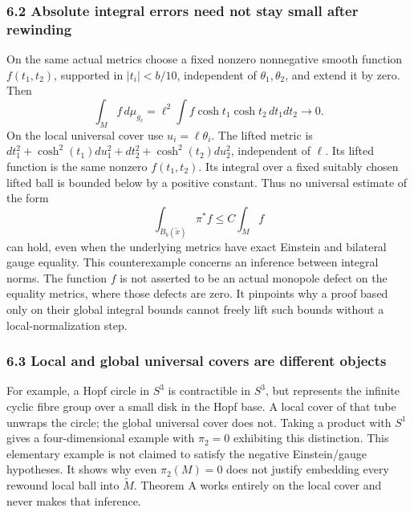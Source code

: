 \documentclass[
  11pt,
]{article}
\begin{document}
\hypertarget{absolute-integral-errors-need-not-stay-small-after-rewinding}{%
\subsubsection{6.2 Absolute integral errors need not stay small after
rewinding}\label{absolute-integral-errors-need-not-stay-small-after-rewinding}}

On the same actual metrics choose a fixed nonzero nonnegative smooth
function \(f(t_1,t_2)\), supported in \(|t_i|<b/10\), independent of
\(\theta_1,\theta_2\), and extend it by zero. Then \[
 \int_M f\,d\mu_{g_\ell}
 =\ell^2\int f\cosh t_1\cosh t_2\,dt_1dt_2\to0.
 \tag{15}
\] On the local universal cover use \(u_i=\ell\theta_i\). The lifted
metric is \(dt_1^2+\cosh^2(t_1)du_1^2+dt_2^2+\cosh^2(t_2)du_2^2\),
independent of \(\ell\). Its lifted function is the same nonzero
\(f(t_1,t_2)\). Its integral over a fixed suitably chosen lifted ball is
bounded below by a positive constant. Thus no universal estimate of the
form \[
            \int_{B_b(\widetilde x)}\pi^*f\le C\int_M f
 \tag{16}
\] can hold, even when the underlying metrics have exact Einstein and
bilateral gauge equality. This counterexample concerns an inference
between integral norms. The function \(f\) is not asserted to be an
actual monopole defect on the equality metrics, where those defects are
zero. It pinpoints why a proof based only on their global integral
bounds cannot freely lift such bounds without a local-normalization
step.

\hypertarget{local-and-global-universal-covers-are-different-objects}{%
\subsubsection{6.3 Local and global universal covers are different
objects}\label{local-and-global-universal-covers-are-different-objects}}

For example, a Hopf circle in \(S^3\) is contractible in \(S^3\), but
represents the infinite cyclic fibre group over a small disk in the Hopf
base. A local cover of that tube unwraps the circle; the global
universal cover does not. Taking a product with \(S^1\) gives a
four-dimensional example with \(\pi_2=0\) exhibiting this distinction.
This elementary example is not claimed to satisfy the negative
Einstein/gauge hypotheses. It shows why even \(\pi_2(M)=0\) does not
justify embedding every rewound local ball into \(\widetilde M\).
Theorem A works entirely on the local cover and never makes that
inference.
\end{document}
